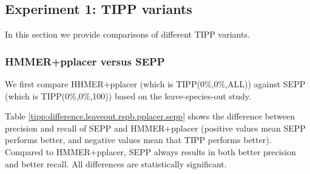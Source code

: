 

\subsection{Experiment 1: TIPP variants}\label{supp:tipp_variants}
In this section we provide comparisons of different TIPP variants. 
\subsubsection{HMMER+pplacer versus SEPP}
We first compare HHMER+pplacer (which is TIPP(0\%,0\%,ALL)) against
SEPP (which is TIPP(0\%,0\%,100)) based on the leave-species-out study. 

Table \ref{tipp:difference.leaveout.rspb.pplacer.sepp} shows the difference between precision and recall of 
SEPP and HMMER+pplacer (positive values mean SEPP performs better, and negative values mean that TIPP performs better). 
Compared to HMMER+pplacer, SEPP always results in both better precision and better recall. 
All differences are statistically significant.

